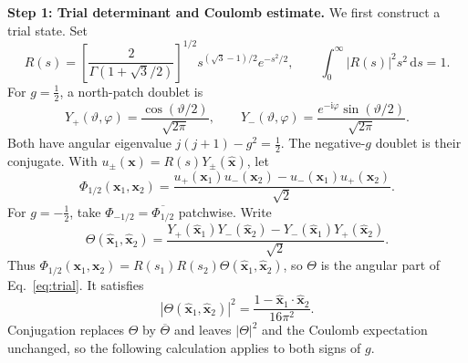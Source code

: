 \documentclass[11pt,a4paper]{article}
\theoremstyle{remark}
\theoremstyle{plain}
\begin{document}
\noindent\textbf{Step 1: Trial determinant and Coulomb estimate.}
We first construct a trial state. Set
\begin{equation}
 R(s)=\left[\frac2{\Gamma(1+\sqrt3/2)}\right]^{1/2}
                   s^{(\sqrt3-1)/2}e^{-s^2/2},\qquad
 \int_0^\infty |R(s)|^2s^2\,\mathrm{d}s=1.
 \label{eq:radial-ground}
\end{equation}
For $g=\tfrac12$, a north-patch doublet is
\begin{equation}
 Y_+(\vartheta,\varphi)=\frac{\cos(\vartheta/2)}{\sqrt{2\pi}},
 \qquad
 Y_-(\vartheta,\varphi)=
               \frac{e^{-\mathrm{i}\varphi}\sin(\vartheta/2)}{\sqrt{2\pi}}.
 \label{eq:doublet}
\end{equation}
Both have angular eigenvalue $j(j+1)-g^2=\tfrac12$.
The negative-$g$ doublet is their conjugate. With
$u_\pm(\mathbf x)=R(s)Y_\pm(\widehat{\mathbf x})$, let
\begin{equation}
 \Phi_{1/2}(\mathbf x_1,\mathbf x_2)=
 \frac{u_+(\mathbf x_1)u_-(\mathbf x_2)
       -u_-(\mathbf x_1)u_+(\mathbf x_2)}{\sqrt2}.
 \label{eq:trial}
\end{equation}
For $g=-\tfrac12$, take $\Phi_{-1/2}=\overline{\Phi_{1/2}}$
patchwise.
Write
\begin{equation}
 \Theta(\widehat{\mathbf x}_1,\widehat{\mathbf x}_2)
 =\frac{Y_+(\widehat{\mathbf x}_1)Y_-(\widehat{\mathbf x}_2)
       -Y_-(\widehat{\mathbf x}_1)Y_+(\widehat{\mathbf x}_2)}{\sqrt2}.
 \label{eq:angular-determinant}
\end{equation}
Thus $\Phi_{1/2}(\mathbf x_1,\mathbf x_2)
=R(s_1)R(s_2)\Theta(\widehat{\mathbf x}_1,\widehat{\mathbf x}_2)$,
so $\Theta$ is the angular part of
Eq.~\eqref{eq:trial}. It satisfies
\begin{equation}
 |\Theta(\widehat{\mathbf x}_1,\widehat{\mathbf x}_2)|^2
 =\frac{1-\widehat{\mathbf x}_1\cdot\widehat{\mathbf x}_2}{16\pi^2}.
 \label{eq:angular-pair}
\end{equation}
Conjugation replaces $\Theta$ by $\overline\Theta$ and leaves
$|\Theta|^2$ and the Coulomb expectation unchanged, so the following
calculation applies to both signs of $g$.
\end{document}
